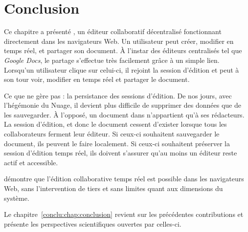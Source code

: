 
\section{Conclusion}
\label{editor:sec:conclusion}

Ce chapitre a présenté \CRATE, un éditeur collaboratif décentralisé fonctionnant
directement dans les navigateurs Web. Un utilisateur peut créer, modifier en
temps réel, et partager son document. À l'instar des éditeurs centralisés tel
que \emph{Google Docs}, le partage s'effectue très facilement grâce à un simple
lien. Lorsqu'un utilisateur clique sur celui-ci, il rejoint la session d'édition
et peut à son tour voir, modifier en temps réel et partager le document.

Ce que \CRATE ne gère pas : la persistance des sessions d'édition. De nos jours,
avec l'hégémonie du Nuage, il devient plus difficile de supprimer des données
que de les sauvegarder. À l'opposé, un document dans \CRATE n'appartient qu'à
ses rédacteurs. La session d'édition, et donc le document cessent d'exister
lorsque tous les collaborateurs ferment leur éditeur. Si ceux-ci souhaitent
sauvegarder le document, ils peuvent le faire localement. Si ceux-ci souhaitent
préserver la session d'édition temps réel, ils doivent s'assurer qu'au moins un
éditeur reste actif et accessible.


\CRATE démontre que l'édition collaborative temps réel est possible dans les
navigateurs Web, sans l'intervention de tiers et sans limites quant aux
dimensions du système.


Le chapitre~\ref{conclu:chap:conclusion} revient sur les précédentes
contributions et présente les perspectives scientifiques ouvertes par celles-ci.

